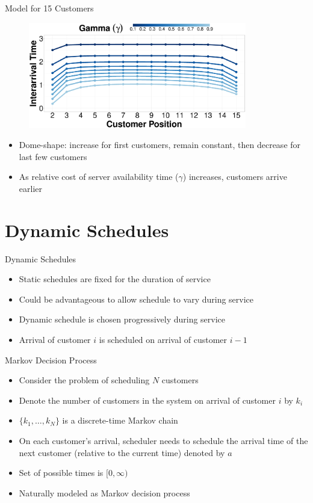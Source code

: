 \documentclass{beamer}
\begin{document}
\begin{frame}{Model for 15 Customers}
	\begin{figure}
			\centering
			\includegraphics[width=0.85\textwidth]{Static_Line_Interarrival_Gamma.eps}
	\end{figure}

	\begin{itemize}
		\item \alert{Dome-shape}: increase for first customers, remain constant, then decrease for last few customers
		\item As relative cost of server availability time ($\gamma$) increases, customers arrive earlier
	\end{itemize}
\end{frame}

\section{Dynamic Schedules}

\begin{frame}{Dynamic Schedules}
	\begin{itemize}
		\item Static schedules are fixed for the duration of service
		\item Could be advantageous to allow schedule to vary during service
		\item \alert{Dynamic schedule} is chosen progressively during service
		\item Arrival of customer $i$ is scheduled on arrival of customer $i - 1$
	\end{itemize}
\end{frame}

\begin{frame}{Markov Decision Process}
	\begin{itemize}
		\item Consider the problem of scheduling $N$ customers
		\item Denote the number of customers in the system on arrival of customer $i$ by $k_{i}$
		\item $\{ k_{1}, \ldots, k_{N} \}$ is a discrete-time Markov chain
		\item On each customer's arrival, scheduler needs to schedule the arrival time of the next customer (relative to the current time) denoted by $a$
		\item Set of possible times is $[0, \infty)$
		\item Naturally modeled as \alert{Markov decision process}
	\end{itemize}
\end{frame}
\end{document}
